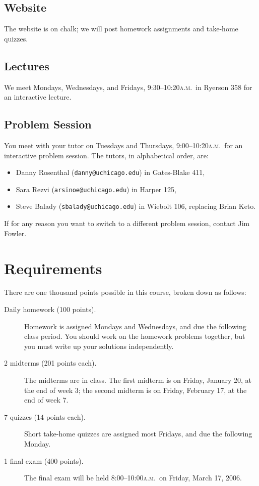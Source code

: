 \documentclass[12pt,letterpaper]{article}
\newcommand{\ayem}{\textsc{a.m.}}
\begin{document}
\subsection*{Website}
The website is on chalk; we will post homework assignments and take-home quizzes.

\subsection*{Lectures}
We meet Mondays, Wednesdays, and Fridays, 9:30--10:20\ayem\ in Ryerson
358 for an interactive lecture.

\subsection*{Problem Session}
You meet with your tutor on Tuesdays and Thursdays, 9:00--10:20\ayem\
for an interactive problem session.  The tutors, in
alphabetical order, are:
\begin{itemize}
\setlength{\itemsep}{-1ex}
\item Danny Rosenthal (\texttt{danny@uchicago.edu}) in Gates-Blake 411,
\item Sara Rezvi (\texttt{arsinoe@uchicago.edu}) in Harper 125,
\item Steve Balady (\texttt{sbalady@uchicago.edu}) in Wiebolt 106,
replacing Brian Keto.
\end{itemize}
If for any reason you want to switch to a different problem session,
contact Jim Fowler.
\pagebreak

\section*{Requirements}

There are one thousand points possible in this course, broken down as follows:
\begin{description}
\item[Daily homework (100 points).]  Homework is assigned Mondays and
Wednesdays, and due the following class period.  You should work on
the homework problems together, but you must write up your solutions
independently.
\item[2 midterms (201 points each).]  The midterms are in class.  The
first midterm is on Friday, January 20, at the end of week 3; the
second midterm is on Friday, February 17, at the end of week 7.
\item[7 quizzes (14 points each).]  Short take-home quizzes are
assigned most Fridays, and due the following Monday.
\item[1 final exam (400 points).]  The final exam will be held
8:00--10:00\ayem\ on Friday, March 17, 2006.
\end{description}
\end{document}
